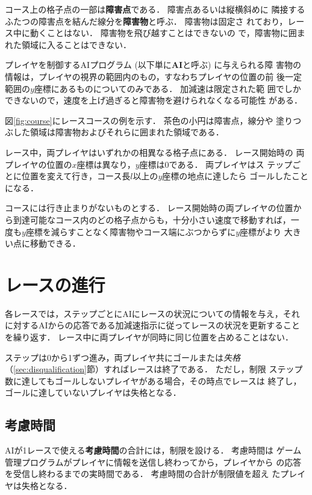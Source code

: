 \documentclass[11pt]{jarticle}
\newcommand\secref[1]{\mbox{\ref{#1}節}}
\begin{document}
コース上の格子点の一部は{\bf 障害点}である．  障害点あるいは縦横斜めに
隣接するふたつの障害点を結んだ線分を{\bf 障害物}と呼ぶ． 障害物は固定さ
れており，レース中に動くことはない．  障害物を飛び越すことはできないの
で，障害物に囲まれた領域に入ることはできない．

プレイヤを制御するAIプログラム (以下単に{\bf AI}と呼ぶ) に与えられる障
害物の情報は，プレイヤの視界の範囲内のもの，すなわちプレイヤの位置の前
後一定範囲の$y$座標にあるものについてのみである． 加減速は限定された範
囲でしかできないので，速度を上げ過ぎると障害物を避けられなくなる可能性
がある．

図\ref{fig:course}にレースコースの例を示す． 茶色の小円は障害点，線分や
塗りつぶした領域は障害物およびそれらに囲まれた領域である．

レース中，両プレイヤはいずれかの相異なる格子点にある．  レース開始時の
両プレイヤの位置の$x$座標は異なり，$y$座標は$0$である．  両プレイヤはス
テップごとに位置を変えて行き，コース長$l$以上の$y$座標の地点に達したら
ゴールしたことになる．

コースには行き止まりがないものとする． レース開始時の両プレイヤの位置か
ら到達可能なコース内のどの格子点からも，十分小さい速度で移動すれば，一
度も$y$座標を減らすことなく障害物やコース端にぶつからずに$y$座標がより
大きい点に移動できる．

\section{レースの進行}\label{sec:race_process}
各レースでは，ステップごとにAIにレースの状況についての情報を与え，それ
に対するAIからの応答である加減速指示に従ってレースの状況を更新すること
を繰り返す．  レース中に両プレイヤが同時に同じ位置を占めることはない．

ステップは0から1ずつ進み，両プレイヤ共にゴールまたは\emph{失格}
（\secref{sec:disqualification}）すればレースは終了である． ただし，制限
ステップ数に達してもゴールしないプレイヤがある場合，その時点でレースは
終了し，ゴールに達していないプレイヤは失格となる．

\subsection{考慮時間}\label{sec:consideration_time}
AIが1レースで使える{\bf 考慮時間}の合計には，制限を設ける． 考慮時間は
ゲーム管理プログラムがプレイヤに情報を送信し終わってから，プレイヤから
の応答を受信し終わるまでの実時間である．  考慮時間の合計が制限値を超え
たプレイヤは失格となる．
\end{document}
